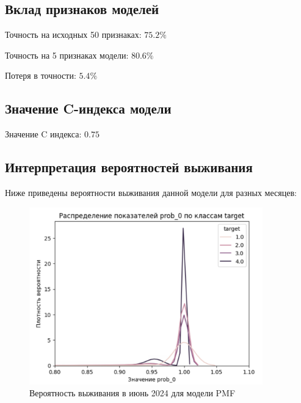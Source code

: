 \documentclass[a4paper,14pt,oneside,openany]{memoir}
\begin{document}
\subsection{Вклад признаков моделей}

Точность на исходных 50 признаках: $75.2\%$

Точность на 5 признаках модели: $80.6\%$

Потеря в точности: $5.4\%$

\subsection{Значение C-индекса модели}

Значение C индекса: $0.75$

\subsection{Интерпретация вероятностей выживания}

Ниже приведены вероятности выживания данной модели для разных месяцев: 

\begin{figure}[H]
	\includegraphics[width=0.9\textwidth]{../figures/prob_0_pmf.png}
	\caption{Вероятность выживания в июнь 2024 для модели PMF}
\end{figure}
\end{document}
